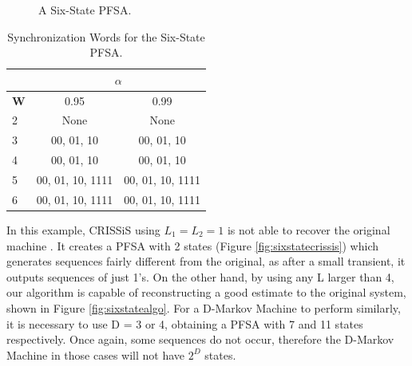 {\begin{figure}
\centering
{}
\caption{A Six-State PFSA.\label{fig:sixstate}}
\end{figure}

\begin{table}
\centering
\caption{Synchronization Words for the Six-State PFSA. \label{tab:tswsynch}}
\begin{tabular}{|l|c|c|}
\hline
 & \multicolumn{2}{c|}{\textbf{$\alpha$}}\\
 \hline
\textbf{W} & 0.95 & 0.99 \\
\hline
2 & None & None \\ 
3 & 00, 01, 10  & 00, 01, 10 \\ 
4 & 00, 01, 10  & 00, 01, 10 \\ 
5 & 00, 01, 10, 1111  & 00, 01, 10, 1111 \\
6 & 00, 01, 10, 1111  & 00, 01, 10, 1111 \\
 \hline
\end{tabular}
\end{table}

In this example, CRISSiS using $L_1 = L_2 = 1$ is not able to recover the original machine . It creates a PFSA with 2 states (Figure \ref{fig:sixstatecrissis}) which generates sequences fairly different from the original, as after a small transient, it outputs sequences of just 1's. On the other hand, by using any L larger than 4, our algorithm is capable of reconstructing a good estimate to the original system, shown in Figure \ref{fig:sixstatealgo}. For a D-Markov Machine to perform similarly, it is necessary to use D = 3 or 4, obtaining a PFSA with 7 and 11 states respectively. Once again, some sequences do not occur, therefore the D-Markov Machine in those cases will not have $2^D$ states.

}
